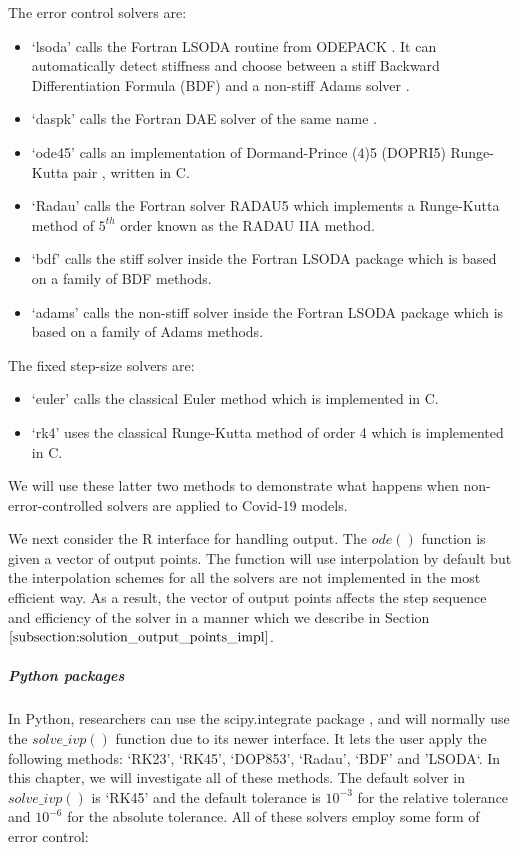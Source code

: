The error control solvers are:
\begin{itemize}
\item `lsoda' calls the Fortran LSODA routine from ODEPACK \cite{MR751604}. It can automatically detect stiffness and choose between a stiff Backward Differentiation Formula (BDF) \cite{MR3822086} and a non-stiff Adams solver \cite{MR3822086}.

\item `daspk' calls the Fortran DAE solver of the same name \cite{MR1379682}.

\item `ode45' calls an implementation of Dormand-Prince (4)5 (DOPRI5) Runge-Kutta pair \cite{MR3822086}, written in C.

\item `Radau' calls the Fortran solver RADAU5 \cite{MR1439506} which implements a Runge-Kutta method of $5^{th}$ order known as the RADAU IIA method.

\item `bdf' calls the stiff solver inside the Fortran LSODA package which is based on a family of BDF methods.

\item `adams' calls the non-stiff solver inside the Fortran LSODA package which is based on a family of Adams methods.
\end{itemize}

The fixed step-size solvers are:
\begin{itemize}
\item `euler' calls the classical Euler method which is implemented in C.
\item `rk4' uses the classical Runge-Kutta method of order 4 which is implemented in C. 
\end{itemize}

We will use these latter two methods to demonstrate what happens when non-error-controlled solvers are applied to Covid-19 models.

We next consider the R interface for handling output. The $ode()$ function is given a vector of output points.  The function will use interpolation by default but the interpolation schemes for all the solvers are not implemented in the most efficient way. As a result, the vector of output points affects the step sequence and efficiency of the solver in a manner which we describe in Section $\ref{subsection:solution_output_points_impl}$.

\subparagraph{Python packages}
In Python, researchers can use the scipy.integrate package \cite{2020SciPy-NMeth}, and will normally use the $solve\_ivp()$ function due to its newer interface. It lets the user apply the following methods: `RK23', `RK45', `DOP853', `Radau', `BDF' and 'LSODA`. In this chapter, we will investigate all of these methods. The default solver in $solve\_ivp()$ is `RK45' and the default tolerance is $10^{-3}$ for the relative tolerance and $10^{-6}$ for the absolute tolerance. All of these solvers employ some form of error control:

